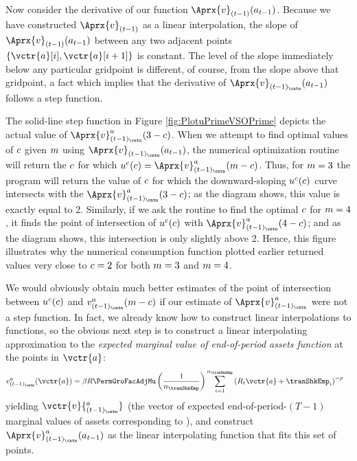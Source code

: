 \documentclass[SolvingMicroDSOPs]{subfiles}
\begin{document}
Now consider the derivative of our function $\Aprx{\vFunc}_{(\prdT-1)}(a_{\prdT-1})$.  Because we have
constructed $\Aprx{\vFunc}_{(\prdT-1)}$ as a linear interpolation, the slope of
$\Aprx{\vFunc}_{(\prdT-1)}(a_{\prdT-1})$ between any two adjacent points
$\{\vctr{a}[i],\vctr{a}[{i+1}]\}$ is constant.  The level of the slope immediately below any
particular gridpoint is different, of course, from the slope above that gridpoint, a fact which
implies that the derivative of $\Aprx{\vFunc}_{(\prdT-1)_\cntn}(a_{\prdT-1})$ follows a step function.

The solid-line step function in Figure \ref{fig:PlotuPrimeVSOPrime} depicts the actual value of
$\Aprx{\vFunc}_{(\prdT-1)_\cntn}^{a}(3-\cNrm)$.  When we attempt to find optimal values of
$c$ given $m$ using $\Aprx{\vFunc}_{(\prdT-1)_\cntn}(a_{\prdT-1})$, the numerical optimization routine will
return the $c$ for which
$\uFunc^{c}(\cNrm) = \Aprx{\vFunc}^{a}_{(\prdT-1)_\cntn}(\mNrm-\cNrm)$.  Thus, for
$m=3$ the program will return the value of $c$ for which the downward-sloping
$u^{c}(c)$ curve intersects with the
$\Aprx{\vFunc}_{(\prdT-1)_\cntn}^{a}(3-\cNrm)$; as the diagram shows, this value is exactly equal to 2.
Similarly, if we ask the routine to find the optimal $c$ for $m=4$, it finds the point of
intersection of $u^{c}(c)$ with $\Aprx{\vFunc}_{(\prdT-1)_\cntn}^{a}(4-\cNrm)$; and as the diagram shows, this
intersection is only slightly above 2.  Hence, this figure illustrates why the numerical consumption
function plotted earlier returned values very close to $c=2$ for both $m=3$ and $m=4$.

We would obviously obtain much better estimates of the point of intersection between $u^{c}(c)$ and $\vFunc_{(\prdT-1)_\cntn}^{a}(\mNrm-\cNrm)$ if our estimate of $\Aprx{\vFunc}^{a}_{(\prdT-1)_\cntn}$ were not a step function.  In fact, we already know how to construct linear interpolations to functions, so the obvious next step is to construct a linear interpolating approximation to the \textit{expected marginal value of end-of-period assets function} at the points in $\vctr{a}$:
\begin{equation}\begin{gathered}\begin{aligned}
      \vFunc_{(\prdT-1)_\cntn}^{a}(\vctr{a})  & =  \DiscFac \Rfree \PermGroFacAdjMu \left(\frac{1}{n_{\tranShkEmp}}\right) \sum_{i=1}^{n_{\tranShkEmp}} \left(\RNrm_{\prdT} \vctr{a} + \tranShkEmp_{i}\right)^{-\CRRA} \label{eq:vEndPrimeTm1}
    \end{aligned}\end{gathered}\end{equation}
yielding $\vctr{v}{^{a}_{(\prdT-1)_\cntn}}$ (the vector of expected end-of-period-$(T-1)$ marginal values of assets corresponding to ),  %
and construct
$\Aprx{\vFunc}_{(\prdT-1)_\cntn}^{a}(a_{\prdT-1})$ as the linear
interpolating function that fits this set of points.
\end{document}
